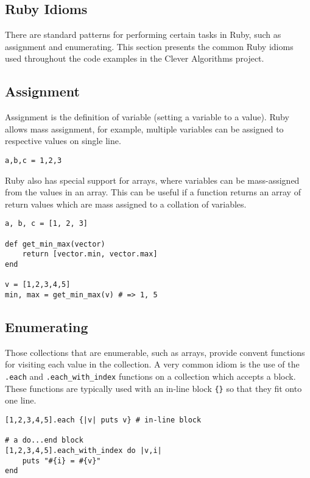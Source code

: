 \begin{bibunit}
% 
% 
\section{Ruby Idioms}
There are standard patterns for performing certain tasks in Ruby, such as assignment and enumerating. This section presents the common Ruby idioms used throughout the code examples in the Clever Algorithms project.

\subsection{Assignment}
Assignment is the definition of variable (setting a variable to a value). Ruby allows mass assignment, for example, multiple variables can be assigned to respective values on single line.

\begin{lstlisting}
a,b,c = 1,2,3
\end{lstlisting}

Ruby also has special support for arrays, where variables can be mass-assigned from the values in an array. This can be useful if a function returns an array of return values which are mass assigned to a collation of variables.

\begin{lstlisting}
a, b, c = [1, 2, 3]

def get_min_max(vector)
	return [vector.min, vector.max]
end

v = [1,2,3,4,5]
min, max = get_min_max(v) # => 1, 5
\end{lstlisting}

\subsection{Enumerating}
Those collections that are enumerable, such as arrays, provide convent functions for visiting each value in the collection. A very common idiom is the use of the \texttt{.each} and \texttt{.each\_with\_index} functions on a collection which accepts a block. These functions are typically used with an in-line block \texttt{\{\}} so that they fit onto one line.

\begin{lstlisting}
[1,2,3,4,5].each {|v| puts v} # in-line block

# a do...end block
[1,2,3,4,5].each_with_index do |v,i|
	puts "#{i} = #{v}"
end
\end{lstlisting}


\end{bibunit}
